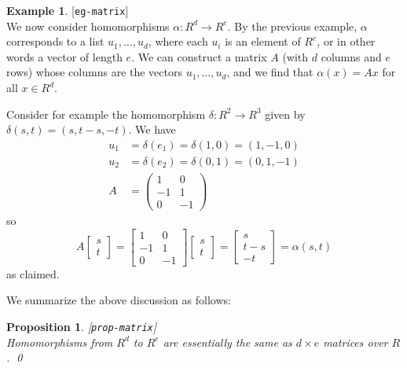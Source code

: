\documentclass{amsart}
\newcommand{\lbl}[1]{\label{#1}\textup{[\texttt{#1}]}\ \\}
\newcommand{\lbl}{\label}
\newcommand{\bbm}       {\left[\begin{matrix}}
\newcommand{\ebm}       {\end{matrix}\right]}
\newcommand{\al}        {\alpha}
\newcommand{\dl}        {\delta}
\newcommand{\tm}        {\times}
\newcommand{\xra}       {\xrightarrow}
\renewcommand{\:}{\colon}
\newtheorem{proposition}[theorem]{Proposition}
\theoremstyle{definition}
\newtheorem{example}[theorem]{Example}
\begin{document}
\begin{example}\lbl{eg-matrix}
 We now consider homomorphisms $\al\:R^d\xra{}R^e$.  By the previous
 example, $\al$ corresponds to a list $u_1,\ldots,u_d$, where each
 $u_i$ is an element of $R^e$, or in other words a vector of length
 $e$.  We can construct a matrix $A$ (with $d$ columns and $e$ rows) 
 whose columns are the vectors $u_1,\ldots,u_d$, and we find that
 $\al(x)=Ax$ for all $x\in R^d$.

 Consider for example the homomorphism $\dl\:R^2\xra{}R^3$ given by
 $\dl(s,t)=(s,t-s,-t)$.  We have
 \begin{align*}
  u_1 &= \dl(e_1) = \dl(1,0) = (1,-1,0) \\
  u_2 &= \dl(e_2) = \dl(0,1) = (0,1,-1) \\
  A &= \left(\begin{array}{cc} 1&0\\-1&1\\0&-1 \end{array}\right)
 \end{align*}
 so
 \[ A\bbm s \\ t\ebm = 
     \bbm 1&0\\-1&1\\0&-1 \ebm \bbm s\\ t\ebm =
     \bbm s \\ t-s \\ -t \ebm = \al(s,t) 
 \]
 as claimed.
\end{example}
We summarize the above discussion as follows:
\begin{proposition}\lbl{prop-matrix}
 Homomorphisms from $R^d$ to $R^e$ are essentially the same as
 $d\tm e$ matrices over $R$. \qed
\end{proposition}
\end{document}
